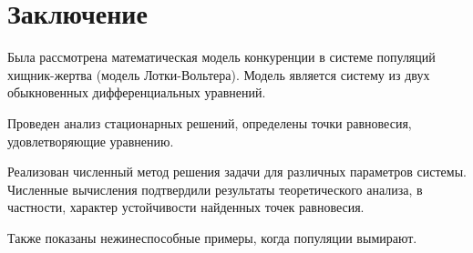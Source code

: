 \chapter{Заключение}
Была рассмотрена математическая модель конкуренции в системе популяций хищник-жертва (модель Лотки-Вольтера).
Модель является систему из двух обыкновенных дифференциальных уравнений.

Проведен анализ стационарных решений, определены точки равновесия, удовлетворяющие уравнению.

Реализован численный метод решения задачи для различных параметров системы. Численные вычисления подтвердили результаты теоретического анализа, в частности, характер устойчивости найденных точек равновесия.

Также показаны нежинеспособные примеры, когда популяции вымирают.